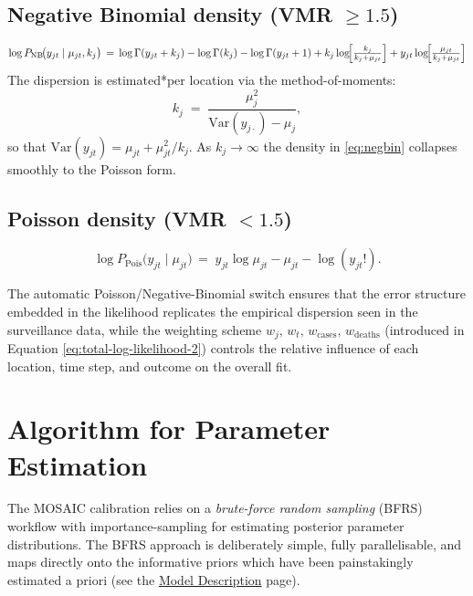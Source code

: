 \documentclass[
]{book}
\begin{document}
\subsection{\texorpdfstring{Negative Binomial density (VMR \(\ge 1.5\))}{Negative Binomial density (VMR \textbackslash ge 1.5)}}\label{negative-binomial-density-vmr-ge-1.5}

\begin{equation}
\log P_{\text{NB}}\!\bigl(y_{jt}\mid\mu_{jt},k_j\bigr)
\,=\,
\log\Gamma(y_{jt}+k_j)-\log\Gamma(k_j)-\log\Gamma(y_{jt}+1)
+k_j\log\!\Bigl[\tfrac{k_j}{k_j+\mu_{jt}}\Bigr]
+y_{jt}\log\!\Bigl[\tfrac{\mu_{jt}}{k_j+\mu_{jt}}\Bigr]
\label{eq:negbin}
\end{equation}
The dispersion is estimated*per location via the method-of-moments:
\begin{equation}
k_j \;=\;\frac{\mu_j^2}{\mathrm{Var}(y_{j\cdot})-\mu_j},
\label{eq:dispersion}
\end{equation}
so that \(\mathrm{Var}(y_{jt})=\mu_{jt}+\mu_{jt}^2/k_j\). As \(k_j\rightarrow\infty\) the density in
\eqref{eq:negbin} collapses smoothly to the Poisson form.

\subsection{\texorpdfstring{Poisson density (VMR \(< 1.5\))}{Poisson density (VMR \textless{} 1.5)}}\label{poisson-density-vmr-1.5}

\begin{equation}
\log P_{\text{Pois}}\!\bigl(y_{jt}\mid\mu_{jt}\bigr)
\,=\;
y_{jt}\log\mu_{jt}-\mu_{jt}-\log(y_{jt}!).
\label{eq:poisson}
\end{equation}

The automatic Poisson/Negative-Binomial switch ensures that the
error structure embedded in the likelihood replicates the empirical
dispersion seen in the surveillance data, while the weighting scheme
\(w_j,\,w_t,\,w_{\text{cases}},\,w_{\text{deaths}}\) (introduced in
Equation \eqref{eq:total-log-likelihood-2}) controls the relative influence
of each location, time step, and outcome on the overall fit.

\section{Algorithm for Parameter Estimation}\label{algorithm-for-parameter-estimation}

The MOSAIC calibration relies on a \emph{brute-force random sampling} (BFRS) workflow with importance-sampling for estimating posterior parameter distributions. The BFRS approach is deliberately simple, fully parallelisable, and maps directly onto the informative priors which have been painstakingly estimated a priori (see the \href{https://www.mosaicmod.org/model-description.html}{Model Description} page).
\end{document}
